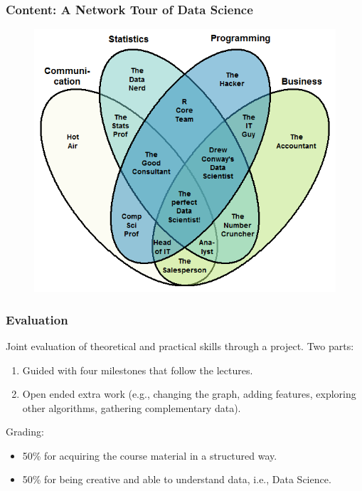 \documentclass[aspectratio=169]{beamer}
\begin{document}
\begin{frame}
	\frametitle{Content: A Network Tour \textbf{of Data Science}}
	\begin{figure}
		\includegraphics[height=0.85\textheight]{data_scientist}
	\end{figure}
\end{frame}


\begin{frame}
	\frametitle{Evaluation}
	Joint evaluation of theoretical and practical skills through a project.
	\vfill
	Two parts:
	\begin{enumerate}
		\item Guided with four milestones that follow the lectures.
		\item Open ended extra work (e.g., changing the graph, adding features, exploring other algorithms, gathering complementary data).
	\end{enumerate}
	\vfill
	Grading:
	\begin{itemize}
		\item 50\% for acquiring the course material in a structured way.
		\item 50\% for being creative and able to understand data, i.e., Data Science.
	\end{itemize}
\end{frame}

\end{document}
